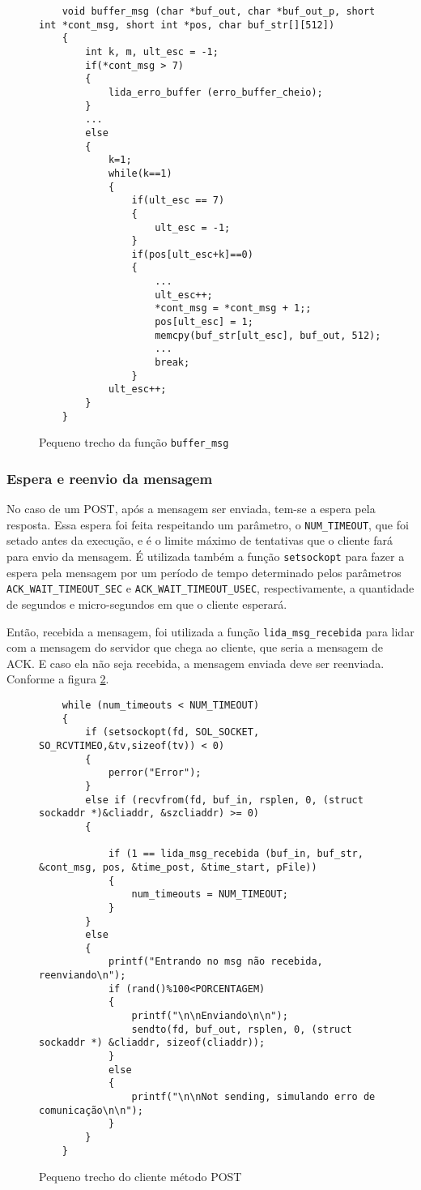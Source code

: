 \begin{figure}[!htb]
	\begin{lstlisting}
	void buffer_msg (char *buf_out, char *buf_out_p, short int *cont_msg, short int *pos, char buf_str[][512])
	{
		int k, m, ult_esc = -1;
		if(*cont_msg > 7)
		{
			lida_erro_buffer (erro_buffer_cheio);
		}
		...
		else
		{
			k=1;
			while(k==1)
			{
				if(ult_esc == 7)
				{
					ult_esc = -1;
				}
				if(pos[ult_esc+k]==0)
				{
					...
					ult_esc++;
					*cont_msg = *cont_msg + 1;;
					pos[ult_esc] = 1;
					memcpy(buf_str[ult_esc], buf_out, 512);
					...
					break;
				}
			ult_esc++;
		}
	}
	\end{lstlisting}
	\caption{Pequeno trecho da função \texttt{buffer\_msg}}
	\label{code:buffer_msg}
\end{figure}

\subsubsection{Espera e reenvio da mensagem}

No caso de um POST, após a mensagem ser enviada, tem-se a espera pela resposta. Essa espera foi feita respeitando um parâmetro, o \texttt{NUM\_TIMEOUT}, que foi setado antes da execução, e é o limite máximo de tentativas que o cliente fará para envio da mensagem. É utilizada também a função \texttt{setsockopt} para fazer a espera pela mensagem por um período de tempo determinado pelos parâmetros \texttt{ACK\_WAIT\_TIMEOUT\_SEC} e \texttt{ACK\_WAIT\_TIMEOUT\_USEC}, respectivamente, a quantidade de segundos e micro-segundos em que o cliente esperará.

Então, recebida a mensagem, foi utilizada a função \texttt{lida\_msg\_recebida} para lidar com a mensagem do servidor que chega ao cliente, que seria a mensagem de ACK. E caso ela não seja recebida, a mensagem enviada deve ser reenviada. Conforme a figura \ref{code:envio_post}. 

\begin{figure}[!htb]
	\begin{lstlisting}
	while (num_timeouts < NUM_TIMEOUT)
	{
		if (setsockopt(fd, SOL_SOCKET, SO_RCVTIMEO,&tv,sizeof(tv)) < 0) 
		{
			perror("Error");
		}		
		else if (recvfrom(fd, buf_in, rsplen, 0, (struct sockaddr *)&cliaddr, &szcliaddr) >= 0)
		{
		
			if (1 == lida_msg_recebida (buf_in, buf_str, &cont_msg, pos, &time_post, &time_start, pFile))
			{
				num_timeouts = NUM_TIMEOUT;
			}			   		
		}
		else
		{
			printf("Entrando no msg não recebida, reenviando\n");
			if (rand()%100<PORCENTAGEM)
			{
				printf("\n\nEnviando\n\n");
				sendto(fd, buf_out, rsplen, 0, (struct sockaddr *) &cliaddr, sizeof(cliaddr));
			}
			else
			{
				printf("\n\nNot sending, simulando erro de comunicação\n\n");
			}
		}
	}
	\end{lstlisting}
	\caption{Pequeno trecho do cliente método POST}
	\label{code:envio_post}
\end{figure}

